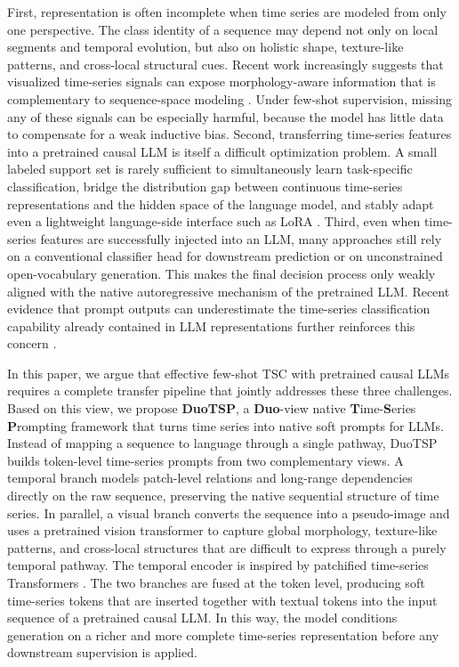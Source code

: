 \documentclass{article}
\begin{document}
    First, representation is often incomplete when time series are modeled from only one perspective. The class identity of a sequence may depend not only on local segments and temporal evolution, but also on holistic shape, texture-like patterns, and cross-local structural cues. Recent work increasingly suggests that visualized time-series signals can expose morphology-aware information that is complementary to sequence-space modeling \cite{ni2025harnessing,liu2025picture}. Under few-shot supervision, missing any of these signals can be especially harmful, because the model has little data to compensate for a weak inductive bias. Second, transferring time-series features into a pretrained causal LLM is itself a difficult optimization problem. A small labeled support set is rarely sufficient to simultaneously learn task-specific classification, bridge the distribution gap between continuous time-series representations and the hidden space of the language model, and stably adapt even a lightweight language-side interface such as LoRA \cite{chang2025llm4ts,cheng2024advancing}. Third, even when time-series features are successfully injected into an LLM, many approaches still rely on a conventional classifier head for downstream prediction or on unconstrained open-vocabulary generation. This makes the final decision process only weakly aligned with the native autoregressive mechanism of the pretrained LLM. Recent evidence that prompt outputs can underestimate the time-series classification capability already contained in LLM representations further reinforces this concern \cite{schumacher2026prompting}.
    
    In this paper, we argue that effective few-shot TSC with pretrained causal LLMs requires a complete transfer pipeline that jointly addresses these three challenges. Based on this view, we propose \textbf{DuoTSP}, a \textbf{Duo}-view native \textbf{T}ime-\textbf{S}eries \textbf{P}rompting framework that turns time series into native soft prompts for LLMs. Instead of mapping a sequence to language through a single pathway, DuoTSP builds token-level time-series prompts from two complementary views. A temporal branch models patch-level relations and long-range dependencies directly on the raw sequence, preserving the native sequential structure of time series. In parallel, a visual branch converts the sequence into a pseudo-image and uses a pretrained vision transformer to capture global morphology, texture-like patterns, and cross-local structures that are difficult to express through a purely temporal pathway. The temporal encoder is inspired by patchified time-series Transformers \cite{nietime}. The two branches are fused at the token level, producing soft time-series tokens that are inserted together with textual tokens into the input sequence of a pretrained causal LLM. In this way, the model conditions generation on a richer and more complete time-series representation before any downstream supervision is applied.
    
\end{document}
